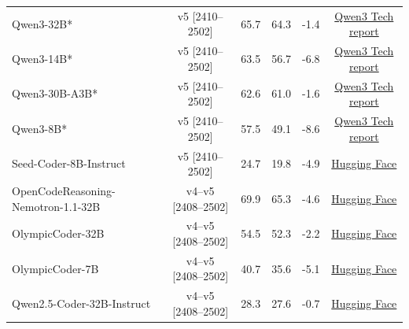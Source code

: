 \begin{table}[hbt]
{\begin{tabular}{lccccc}
\midrule

\rowcolor{gray!10}
Qwen3-32B* & v5 [2410--2502] & 65.7 & 64.3 & -1.4 & \href{https://arxiv.org/pdf/2505.09388}{Qwen3 Tech report} \\

Qwen3-14B* & v5 [2410--2502] & 63.5 & 56.7 & -6.8 & \href{https://arxiv.org/pdf/2505.09388}{Qwen3 Tech report}  \\


\rowcolor{gray!10}
Qwen3-30B-A3B* & v5 [2410--2502] & 62.6 & 61.0 & -1.6 & \href{https://arxiv.org/pdf/2505.09388}{Qwen3 Tech report} \\

Qwen3-8B* & v5 [2410--2502] & 57.5 & 49.1 & -8.6 & \href{https://arxiv.org/pdf/2505.09388}{Qwen3 Tech report}\\
\rowcolor{gray!10}
Seed-Coder-8B-Instruct & v5 [2410--2502] & 24.7 & 19.8 & -4.9 & \href{https://huggingface.co/ByteDance-Seed/Seed-Coder-8B-Instruct}{Hugging Face} \\
\midrule
\rowcolor{gray!10}
OpenCodeReasoning-Nemotron-1.1-32B & v4--v5 [2408--2502] & 69.9 & 65.3 & -4.6 & \href{https://huggingface.co/nvidia/OpenCodeReasoning-Nemotron-1.1-32B}{Hugging Face}\\

OlympicCoder-32B & v4--v5 [2408--2502] & 54.5 & 52.3 & -2.2 & \href{https://huggingface.co/open-r1/OlympicCoder-32B}{Hugging Face} \\

\rowcolor{gray!10}
OlympicCoder-7B & v4--v5 [2408--2502] & 40.7 & 35.6 & -5.1 & \href{https://huggingface.co/open-r1/OlympicCoder-32B}{Hugging Face} \\

Qwen2.5-Coder-32B-Instruct & v4--v5 [2408--2502] & 28.3 & 27.6 & -0.7  & \href{https://huggingface.co/open-r1/OlympicCoder-32B}{Hugging Face} \\

\bottomrule
\end{tabular}
}
\end{table}
